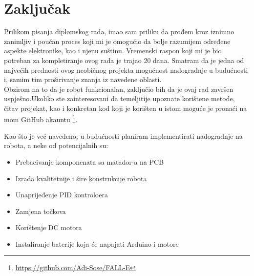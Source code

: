 \documentclass[../Document.tex]{subfiles}
\begin{document}
\section{Zaključak}
Prilikom pisanja diplomskog rada, imao sam priliku da prođem kroz iznimno zanimljiv i poučan proces koji mi je omogućio da bolje razumijem određene aspekte elektronike, kao i njenu suštinu. Vremenski raspon koji mi je bio potreban za kompletiranje ovog rada je trajao 20 dana. Smatram da je jedna od najvećih prednosti ovog neobičnog projekta mogućnost nadogradnje u budućnosti i, samim tim proširivanje znanja iz navedene oblasti.\\

\noindent Obzirom na to da je robot funkcionalan, zaključio bih da je ovaj rad završen uspješno.Ukoliko ste zainteresovani da temeljitije upoznate korištene metode, čitav projekat, kao i konkretan kod koji je korišten u istom moguće je pronaći na mom GitHub akauntu \footnote{\url{https://github.com/Adi-Sose/FALL-E}}.

\noindent Kao što je već navedeno, u budućnosti planiram implementirati nadogradnje na robota, a neke od potencijalnih su:

\begin{itemize}
    \item Prebacivanje komponenata sa matador-a na PCB
    \item Izrada kvalitetnije i šire konstrukcije robota
    \item Unaprijeđenje PID kontroloera
    \item Zamjena točkova
    \item Korištenje DC motora
    \item Instaliranje baterije koja će napajati Arduino i motore
\end{itemize}
\end{document}
